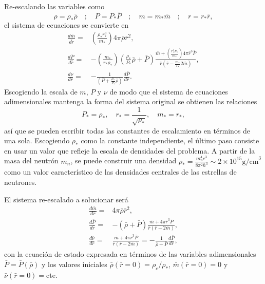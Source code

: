 Re-escalando las variables como
\begin{equation}
    \rho=\rho_* \bar{\rho} \quad ; \quad P=P_* \bar{P} \quad ; \quad m=m_*\bar{m} \quad ; \quad r=r_*\bar{r},
\end{equation}
el sistema de ecuaciones se convierte en
\begin{align}
\frac{d\bar{m}}{\bar{dr}}=&\left( \frac{\rho_* r_*^3}{m_*} \right) 4\pi \bar{\rho} \bar{r}^2 ,\\
\frac{d\bar{P}}{d\bar{r}}=&-\left( \frac{m_*}{r_* \rho_*} \right)\left(\frac{\rho_*}{P_*}\bar{\rho}+\bar{P}\right)\frac{\bar{m}+\left( \frac{r_*^3 P_*}{m_*} \right)4\pi \bar{r}^3 \bar{P}}{\bar{r}\left(\bar{r}-\frac{m_*}{r_*}2\bar{m}\right)} , \\
 \frac{d\nu}{d\bar{r}}=&-\frac{1}{\left(\bar{P}+\frac{\rho_*}{P_*}\bar{\rho}\right)}\frac{d\bar{P}}{d\bar{r}}.
\end{align}
Escogiendo la escala de $m$, $P$ y $\nu$ de modo que el sistema de ecuaciones adimensionales mantenga la forma del sistema original se obtienen las relaciones
\begin{equation}
    P_*=\rho_*,\quad r_*=\frac{1}{\sqrt{\rho_*}} ,\quad m_*=r_* ,
\end{equation}
así que se pueden escribir todas las constantes de escalamiento en términos de una sola.
Escogiendo $\rho_*$ como la constante independiente, el último paso consiste en usar un valor que refleje la escala de densidades del problema. A partir de la masa del neutrón $m_n$, se puede construir una densidad $\rho_* = \frac{m_{n}^{4}c^{3}}{8 \pi^2 \hbar^3}\sim 2\times 10^{15} \text{g/cm}^{3}$ como un valor característico de las densidades centrales de las estrellas de neutrones.

El sistema re-escalado a solucionar será
\begin{align}\label{adimensional}
      \frac{d\bar{m}}{d\bar{r}}=&4\pi \bar{\rho} \bar{r}^2 , \nonumber \\
    \frac{d\bar{P}}{d\bar{r}}=&-(\bar{\rho}+\bar{P})\frac{\bar{m}+4\pi \bar{r}^3 \bar{P}}{\bar{r}(\bar{r}-2\bar{m})} , \\
    \frac{d\bar{\nu}}{d\bar{r}}=& \frac{\bar{m}+4\pi \bar{r}^3 \bar{P}}{\bar{r}(\bar{r}-2\bar{m})} =  -\frac{1}{\bar{\rho}+\bar{P}}\frac{d\bar{P}}{d\bar{r}},\nonumber
\end{align}
con la ecuación de estado expresada en términos de las variables adimensionales $\bar{P}=\bar{P}(\bar{\rho})$ y los valores iniciales $\bar{\rho}(\bar{r}=0)=\rho_c / \rho_{*}$, $\bar{m}(\bar{r}=0)=0$ y $\bar{\nu}(\bar{r}=0)=\text{cte}$.

